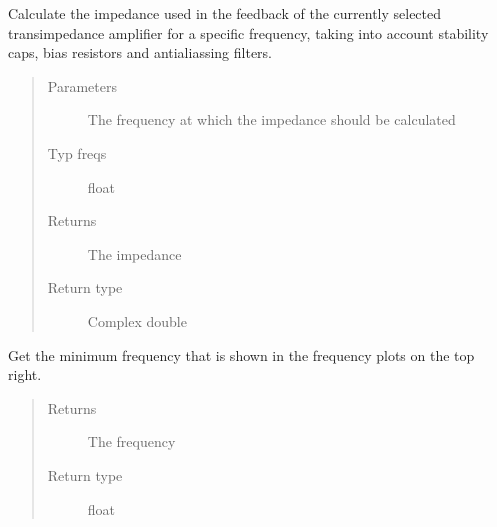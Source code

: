 \documentclass[letterpaper,10pt,english]{sphinxmanual}
\begin{document}
\begin{fulllineitems}

\begin{fulllineitems}
\label{\detokenize{index:TiePieLCR_settings.TiePieLCR_settings.get_measurement_z}}
\sphinxAtStartPar
Calculate the impedance used in the feedback of the currently selected transimpedance amplifier for a specific frequency, taking into account stability caps, bias resistors and anti\sphinxhyphen{}aliassing filters.
\begin{quote}\begin{description}
\item[{Parameters}] \leavevmode
\sphinxAtStartPar
{} \textendash{} The frequency at which the impedance should be calculated

\item[{Typ freqs}] \leavevmode
\sphinxAtStartPar
float

\item[{Returns}] \leavevmode
\sphinxAtStartPar
The impedance

\item[{Return type}] \leavevmode
\sphinxAtStartPar
Complex double

\end{description}\end{quote}

\end{fulllineitems}


\begin{fulllineitems}
\label{\detokenize{index:TiePieLCR_settings.TiePieLCR_settings.get_minimum_plot_frequency}}
\sphinxAtStartPar
Get the minimum frequency that is shown in the frequency plots on the top right.
\begin{quote}\begin{description}
\item[{Returns}] \leavevmode
\sphinxAtStartPar
The frequency

\item[{Return type}] \leavevmode
\sphinxAtStartPar
float


\end{description}
\end{quote}
\end{fulllineitems}
\end{fulllineitems}
\end{document}
